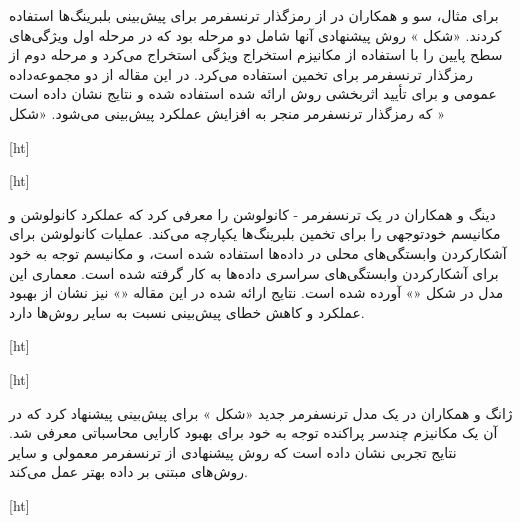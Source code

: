 برای مثال، سو و همکاران در  از رمزگذار ترنسفرمر برای پیش‌بینی  بلبرینگ‌ها استفاده کردند. «شکل » روش پیشنهادی آنها شامل دو مرحله بود که در مرحله اول ویژگی‌های سطح پایین را با استفاده از مکانیزم استخراج ویژگی استخراج می‌کرد و مرحله دوم از رمزگذار ترنسفرمر برای تخمین  استفاده می‌کرد. در این مقاله از دو مجموعه‌داده عمومی  و  برای تأیید اثربخشی روش ارائه شده استفاده شده و نتایج نشان داده است که رمزگذار ترنسفرمر منجر به افزایش عملکرد پیش‌بینی می‌شود. «شکل »



[ht]



[ht]



دینگ و همکاران در  یک ترنسفرمر - کانولوشن را معرفی کرد که عملکرد کانولوشن و مکانیسم خودتوجهی را برای تخمین  بلبرینگ‌ها یکپارچه می‌کند. عملیات کانولوشن برای آشکارکردن وابستگی‌های محلی در داده‌ها استفاده شده است، و مکانیسم توجه به خود برای آشکارکردن وابستگی‌های سراسری داده‌ها به کار گرفته شده است. معماری این مدل در شکل «» آورده شده است. نتایج ارائه شده در این مقاله «» نیز نشان از بهبود عملکرد و کاهش خطای پیش‌بینی نسبت به سایر روش‌ها دارد.




[ht]



[ht]




ژانگ و همکاران در  یک مدل ترنسفرمر جدید «شکل » برای پیش‌بینی  پیشنهاد کرد که در آن یک مکانیزم چندسر پراکنده توجه به خود برای بهبود کارایی محاسباتی معرفی شد. نتایج تجربی نشان داده است که روش پیشنهادی از ترنسفرمر معمولی و سایر روش‌های مبتنی بر داده بهتر عمل می‌کند.


[ht]
